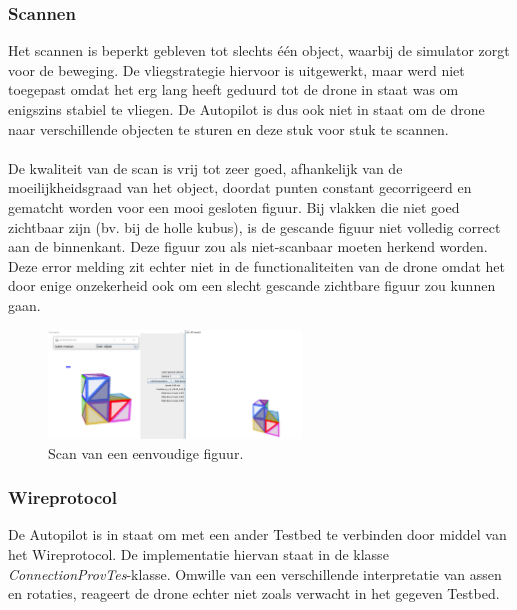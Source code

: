 \subsubsection{Scannen}
Het scannen is beperkt gebleven tot slechts \'e\'en object, waarbij de simulator zorgt voor de beweging. De vliegstrategie hiervoor is uitgewerkt, maar werd niet toegepast omdat het erg lang heeft geduurd tot de drone in staat was om enigszins stabiel te vliegen. De Autopilot is dus ook niet in staat om de drone naar verschillende objecten te sturen en deze stuk voor stuk te scannen. \\
\\
\noindent
De kwaliteit van de scan is vrij tot zeer goed, afhankelijk van de moeilijkheidsgraad van het object, doordat punten constant gecorrigeerd en gematcht worden voor een mooi gesloten figuur. Bij vlakken die niet goed zichtbaar zijn (bv. bij de holle kubus), is de gescande figuur niet volledig correct aan de binnenkant. Deze figuur zou als niet-scanbaar moeten herkend worden. Deze error melding zit echter niet in de functionaliteiten van de drone omdat het door enige onzekerheid ook om een slecht gescande zichtbare figuur zou kunnen gaan.
\begin{figure}[H]
\centering
	\includegraphics[width=0.6\textwidth]{letterL.png}
	\caption{Scan van een eenvoudige figuur.}
    \label{fig:ScanFly}
\end{figure}


\subsubsection{Wireprotocol}
De Autopilot is in staat om met een ander Testbed te verbinden door middel van het Wireprotocol. De implementatie hiervan staat in de klasse \textit{ConnectionProvTes}-klasse. Omwille van een verschillende interpretatie van assen en rotaties, reageert de drone echter niet zoals verwacht in het gegeven Testbed.